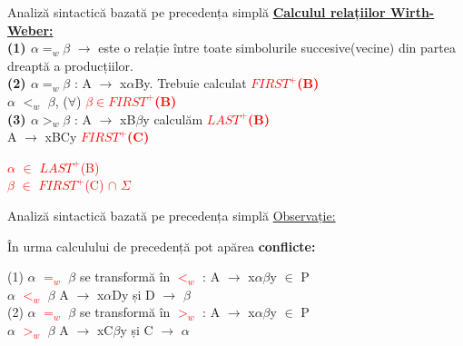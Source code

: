 \documentclass[pdf]{beamer}
\begin{document}
\begin{frame}{Analiză sintactică bazată pe precedența simplă}
\textcolor{ballblue}{\underline{\textbf{Calculul relațiilor Wirth-Weber:}}}\\
\textcolor{ballblue}{\textbf{(1) $\alpha =_{w}\beta$}} $\rightarrow$ este o relație între toate simbolurile succesive(vecine) din partea dreaptă a producțiilor.\\
\textcolor{ballblue}{\textbf{(2) $\alpha =_{w}\beta$}} : A $\rightarrow$ x$\alpha$By. Trebuie calculat \textcolor{red}{\textbf{$FIRST^+$(B)}}\\
\hspace{1.8cm} $\alpha$ $<_{w}$ $\beta$, ($\forall$)  \textcolor{red}{\textbf{$\beta \in FIRST^+$(B)}}\\
\textcolor{ballblue}{\textbf{(3) $\alpha >_{w}\beta$}} :  A $\rightarrow$ xB$\beta$y \hspace{1cm} calculăm \textcolor{red}{\textbf{$LAST^+$(B)}}\\
\hspace{2.2cm} A $\rightarrow$ xBCy \hspace{2.5cm} \textcolor{red}{\textbf{$FIRST^+$(C)}}\\

\begin{center}
	\textcolor{red}{$\alpha$ $\in$ $LAST^+$(B)}\\
	\textcolor{red}{$\beta$ $\in$ $FIRST^+$(C) $\cap$ $\Sigma$}
\end{center}
\end{frame}



\begin{frame}{Analiză sintactică bazată pe precedența simplă}
\textcolor{ballblue}{\underline{Observație:}}\\
\begin{center}
În urma calculului de precedență pot apărea \textcolor{ballblue}{\textbf{conflicte:}}\\
\end{center}
(1) $\alpha$ \textcolor{red}{$=_{w}$} $\beta$ se transformă în \textcolor{red}{$<_{w}$} : A $\rightarrow$ x$\alpha \beta$y $\in$ P\\
 \hspace{0.5cm} $\alpha$ \textcolor{red}{$<_{w}$} $\beta$   \hspace{3.5cm} A $\rightarrow$ x$\alpha$Dy și D $\rightarrow$ $\beta$\\
(2) $\alpha$ \textcolor{red}{$=_{w}$} $\beta$ se transformă în \textcolor{red}{$>_{w}$} : A $\rightarrow$ x$\alpha \beta$y $\in$ P\\
 \hspace{0.5cm} $\alpha$ \textcolor{red}{$>_{w}$} $\beta$   \hspace{3.5cm} A $\rightarrow$ xC$\beta$y și C $\rightarrow$ $\alpha$\\
\end{frame}
\end{document}
